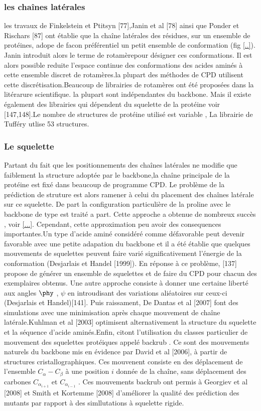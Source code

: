 \subsubsection{les chaînes latérales}

les travaux de Finkelstein et Ptitsyn [77],Janin et al [78] ainsi que Ponder et Rischars [87] ont établie que la chaîne latérales des résidues, sur un ensemble de protéines, adope de facon préférentiel un petit ensemble de conformation (fig \ref{..}). Janin introduit alors le terme de \og rotamère\fg pour désigner ces conformations. Il est alors possible reduite l'espace continue des conformations des acides aminés à cette ensemble discret de rotamères.la plupart des méthodes de CPD utilisent cette discrétisation.Beaucoup de librairies de rotamères ont été proposées dans la litérarure scientifique. la plupart sont indépendantes du backbone. Mais il existe également des librairies qui dépendent du squelette de la protéine voir [147,148].Le nombre de structures de protéine utilisé est variable , La librairie de Tufféry utlise 53 structures. 

\subsubsection{Le squelette}
Partant du fait que les positionnements des chaînes latérales ne modifie que faiblement la structure adoptée par le backbone,la chaîne principale de la protéine est fixé dans beaucoup de programme CPD. Le problème de la prédiction de struture est alors ramener à celui du placement des chaînes latérale sur ce squelette. De part la configuration particulière de la proline avec le backbone de type est traité a part. Cette approche a obtenue de nombreux succès , voir \ref{...}.
Cependant, cette approximation peu avoir des consequences importantes.Un type d'acide aminé considéré comme défavorable peut devenir favorable avec une petite adapation du backbone et il a été établie que quelques mouvements de squelettes peuvent faire varié significativement l'énergie de la conformation (Desjarlais et Handel [1999]).
En réponse à ce problème, [137] propose de générer un ensemble de squelettes et de faire du CPD pour chacun des exemplaires obtenus. Une autre approche consiste à donner une certaine liberté aux angles $\phy$ , $\psi$ en introudisant des variations aliéatoires sur ceux-ci (Desjarlais et Handel)[141].
Puis raissament, De Dantas et al [2007] font des simulations avec une minimisation après chaque mouvement de chaîne latérale.Kuhlman et al [2003] optimisent alternativement la structure du squelette et la séquence d'acide aminés.Enfin, citont l'utilisation du classes particulier de mouvement des squelettes protéiques appelé \og backrub \fg. Ce sont des mouvements naturels du backbone mis en évidence par David et al [2006], à partir de structures cristallographiques. Ces mouvenent consiste en des déplacement de l'ensemble $C_{\alpha}-C_{\beta}$ à une position $i$ donnée de la chaîne, sans déplacement des carbones $C_{\alpha_{i+1}}$ et $C_{\alpha_{i-1}}$ . Ces mouvements backrub ont permis à Georgiev et al [2008] et Smith et Kortemme [2008] d'améliorer la qualité des prédiction des mutants par rapport à des simllutations à squelette rigide.

